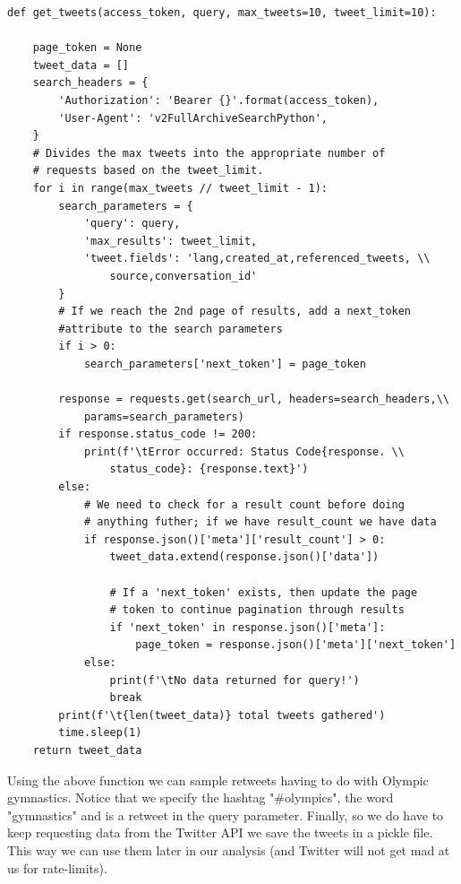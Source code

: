 \documentclass[12pt]{article}
\begin{document}
            \begin{lstlisting}[caption=Tweet Generator]
def get_tweets(access_token, query, max_tweets=10, tweet_limit=10):

    page_token = None
    tweet_data = []
    search_headers = {
        'Authorization': 'Bearer {}'.format(access_token),
        'User-Agent': 'v2FullArchiveSearchPython',
    }
    # Divides the max tweets into the appropriate number of 
    # requests based on the tweet_limit.
    for i in range(max_tweets // tweet_limit - 1):
        search_parameters = {
            'query': query,
            'max_results': tweet_limit,
            'tweet.fields': 'lang,created_at,referenced_tweets, \\
                source,conversation_id'
        }
        # If we reach the 2nd page of results, add a next_token 
        #attribute to the search parameters
        if i > 0:
            search_parameters['next_token'] = page_token

        response = requests.get(search_url, headers=search_headers,\\
            params=search_parameters)
        if response.status_code != 200:
            print(f'\tError occurred: Status Code{response. \\
                status_code}: {response.text}')
        else:
            # We need to check for a result count before doing 
            # anything futher; if we have result_count we have data
            if response.json()['meta']['result_count'] > 0:
                tweet_data.extend(response.json()['data'])
                
                # If a 'next_token' exists, then update the page 
                # token to continue pagination through results
                if 'next_token' in response.json()['meta']:
                    page_token = response.json()['meta']['next_token']
            else:
                print(f'\tNo data returned for query!')
                break        
        print(f'\t{len(tweet_data)} total tweets gathered')
        time.sleep(1)
    return tweet_data
            \end{lstlisting}

            Using the above function we can sample retweets having to do with Olympic gymnastics. Notice that we specify the hashtag "\#olympics", the word "gymnastics" and is a retweet
            in the query parameter. Finally, so we do have to keep requesting data from the Twitter API we save the tweets in a pickle file. This way we can use them later in our
            analysis (and Twitter will not get mad at us for rate-limits).\\
            
\end{document}
